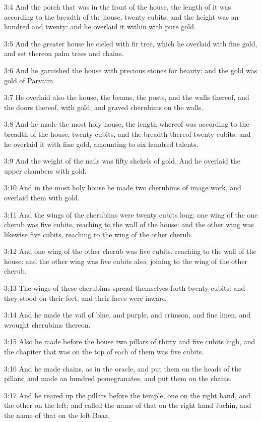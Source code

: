 3:4 And the porch that was in the front of the house, the length of it
was according to the breadth of the house, twenty cubits, and the
height was an hundred and twenty: and he overlaid it within with pure
gold.

3:5 And the greater house he cieled with fir tree, which he overlaid
with fine gold, and set thereon palm trees and chains.

3:6 And he garnished the house with precious stones for beauty: and
the gold was gold of Parvaim.

3:7 He overlaid also the house, the beams, the posts, and the walls
thereof, and the doors thereof, with gold; and graved cherubims on the
walls.

3:8 And he made the most holy house, the length whereof was according
to the breadth of the house, twenty cubits, and the breadth thereof
twenty cubits: and he overlaid it with fine gold, amounting to six
hundred talents.

3:9 And the weight of the nails was fifty shekels of gold. And he
overlaid the upper chambers with gold.

3:10 And in the most holy house he made two cherubims of image work,
and overlaid them with gold.

3:11 And the wings of the cherubims were twenty cubits long: one wing
of the one cherub was five cubits, reaching to the wall of the house:
and the other wing was likewise five cubits, reaching to the wing of
the other cherub.

3:12 And one wing of the other cherub was five cubits, reaching to the
wall of the house: and the other wing was five cubits also, joining to
the wing of the other cherub.

3:13 The wings of these cherubims spread themselves forth twenty
cubits: and they stood on their feet, and their faces were inward.

3:14 And he made the vail of blue, and purple, and crimson, and fine
linen, and wrought cherubims thereon.

3:15 Also he made before the house two pillars of thirty and five
cubits high, and the chapiter that was on the top of each of them was
five cubits.

3:16 And he made chains, as in the oracle, and put them on the heads
of the pillars; and made an hundred pomegranates, and put them on the
chains.

3:17 And he reared up the pillars before the temple, one on the right
hand, and the other on the left; and called the name of that on the
right hand Jachin, and the name of that on the left Boaz.

